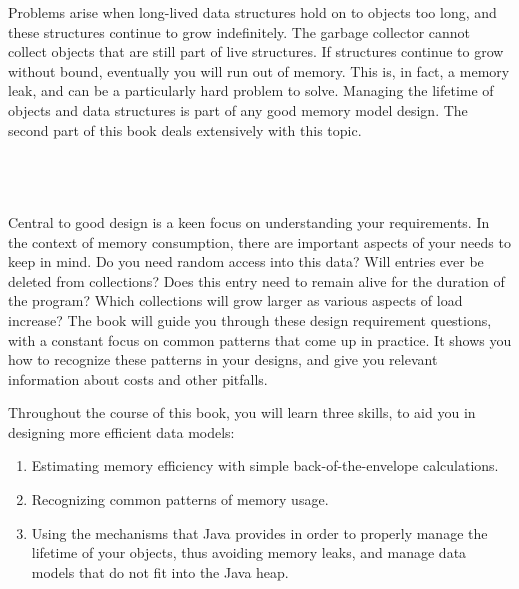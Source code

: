 Problems arise when long-lived data
structures hold on to objects too long, and these structures continue to grow
indefinitely. The garbage collector cannot collect objects that are still part
of live structures. If structures continue to grow without bound, eventually you
will run out of memory. This is, in fact, a memory leak, and can be a
particularly hard problem to solve. Managing the lifetime of objects and data
structures is part of any good memory model design. The second part of this book
deals extensively with this topic.


\section{\thetitle}



Central to good design is a keen focus on understanding your requirements.
In the context of memory consumption, there are important aspects of your needs
to keep in mind. Do you need random access into this data? Will entries ever be
deleted from collections? Does this entry need to remain alive for the duration
of the program? Which collections will grow larger as various aspects of load
increase? The book will guide you through these design requirement questions,
with a constant focus on common patterns that come up in practice. It shows you
how to recognize these patterns in your designs, and give you relevant
information about costs and other pitfalls.

Throughout the course of this book, you will learn three skills, to aid you in
designing more efficient data models:
\begin{enumerate}
  \item Estimating memory efficiency with simple back-of-the-envelope
  calculations.
  \item Recognizing common patterns of memory usage.
  \item Using the mechanisms that Java provides in order to properly manage the
  lifetime of your objects, thus avoiding memory leaks, and manage data models
  that do not fit into the Java heap.
\end{enumerate} 

